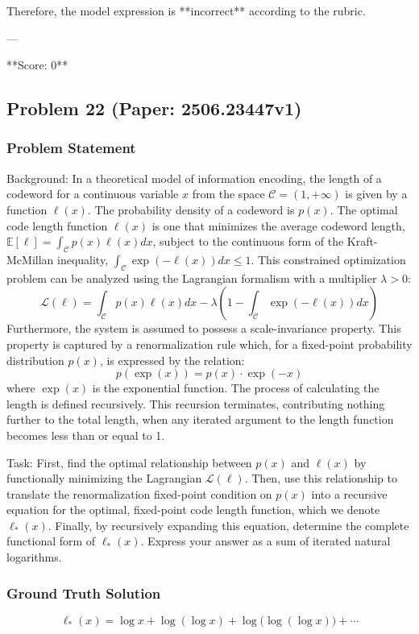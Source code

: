 \documentclass[10pt]{article}
\begin{document}
Therefore, the model expression is **incorrect** according to the rubric.

---

**Score: 0**

\newpage
\subsection*{Problem 22 (Paper: 2506.23447v1)}
\subsubsection*{Problem Statement}
Background:
In a theoretical model of information encoding, the length of a codeword for a continuous variable $x$ from the space $\mathcal{C} = (1, +\infty)$ is given by a function $\ell(x)$. The probability density of a codeword is $p(x)$. The optimal code length function $\ell(x)$ is one that minimizes the average codeword length, $\mathbb{E}[\ell] = \int_\mathcal{C} p(x) \ell(x) dx$, subject to the continuous form of the Kraft-McMillan inequality, $\int_\mathcal{C} \exp(-\ell(x)) dx \leq 1$. This constrained optimization problem can be analyzed using the Lagrangian formalism with a multiplier $\lambda > 0$:
$$ \mathcal{L}(\ell) = \int_\mathcal{C} p(x) \ell(x) dx - \lambda \left( 1 - \int_\mathcal{C} \exp(-\ell(x)) dx \right) $$
Furthermore, the system is assumed to possess a scale-invariance property. This property is captured by a renormalization rule which, for a fixed-point probability distribution $p(x)$, is expressed by the relation:
$$ p(\exp(x)) = p(x) \cdot \exp(-x) $$
where $\exp(x)$ is the exponential function. The process of calculating the length is defined recursively. This recursion terminates, contributing nothing further to the total length, when any iterated argument to the length function becomes less than or equal to 1.

Task:
First, find the optimal relationship between $p(x)$ and $\ell(x)$ by functionally minimizing the Lagrangian $\mathcal{L}(\ell)$. Then, use this relationship to translate the renormalization fixed-point condition on $p(x)$ into a recursive equation for the optimal, fixed-point code length function, which we denote $\ell_*(x)$. Finally, by recursively expanding this equation, determine the complete functional form of $\ell_*(x)$. Express your answer as a sum of iterated natural logarithms.

\subsubsection*{Ground Truth Solution}
\[ \boxed{\ell_*(x) = \log x + \log(\log x) + \log\bigl(\log(\log x)\bigr) + \cdots} \]
\end{document}
